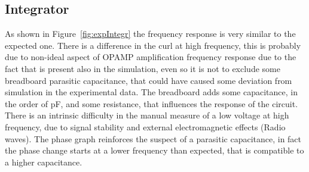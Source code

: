 \documentclass[a4paper, twocolumn]{article}
\begin{document}
\subsection{Integrator}

As shown in Figure~\ref{fig:expIntegr} the frequency response is very similar to the expected one. There is a difference in the curl at high frequency, this is probably due to non-ideal aspect of OPAMP amplification frequency response due to the fact that is present also in the simulation, even so it is not to exclude some breadboard parasitic capacitance, that could have caused some deviation from simulation in the experimental data. The breadboard adds some capacitance, in the order of \unit{\pico\farad}, and some resistance, that influences the response of the circuit. There is an intrinsic difficulty in the manual measure of a low voltage at high frequency, due to signal stability and external electromagnetic effects (Radio waves). The phase graph reinforces the suspect of a parasitic capacitance, in fact the phase change starts at a lower frequency than expected, that is compatible to a higher capacitance.
\end{document}
